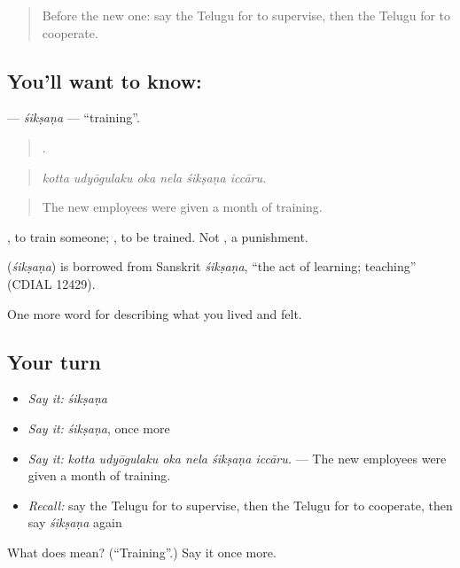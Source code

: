 \begin{quote}
Before the new one: say the Telugu for to supervise, then the Telugu for to cooperate.
\end{quote}

\subsection*{You'll want to know: }
\textbf{} — \emph{śikṣaṇa} — \textquotedblleft{}training\textquotedblright{}.

\begin{quote}
     .
\end{quote}

\begin{quote}
\emph{kotta udyōgulaku oka nela śikṣaṇa iccāru.}
\end{quote}

\begin{quote}
The new employees were given a month of training.
\end{quote}

 , to train someone;  , to be trained. Not , a punishment.

\begin{cousinweb}
\textbf{} (\emph{śikṣaṇa}) is borrowed from Sanskrit \emph{śikṣaṇa}, \textquotedblleft{}the act of learning; teaching\textquotedblright{} (CDIAL 12429).
\end{cousinweb}

\begin{grammarlens}[title={What you've built}]
One more word for describing what you lived and felt.
\end{grammarlens}

\subsection*{Your turn}
\begin{itemize}
\raggedright
  \item \emph{Say it:} \emph{śikṣaṇa}
  \item \emph{Say it:} \emph{śikṣaṇa}, once more
  \item \emph{Say it:} \emph{kotta udyōgulaku oka nela śikṣaṇa iccāru.} — The new employees were given a month of training.
  \item \emph{Recall:} say the Telugu for to supervise, then the Telugu for to cooperate, then say \emph{śikṣaṇa} again
\end{itemize}

\begin{tcolorbox}[breakable,colback=teal!4,colframe=teal!35!black,title={Before you move on}]
What does  mean? (\textquotedblleft{}Training\textquotedblright{}.) Say it once more.
\end{tcolorbox}
